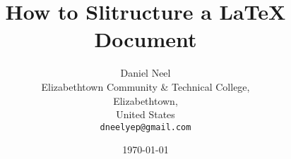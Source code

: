 \documentclass[11pt,a4paper,oneside]{article}
\begin{document}
\title{How to Slitructure a \LaTeX{} Document}
\author{Daniel Neel\\
  Elizabethtown Community \& Technical College,\\
  Elizabethtown,\\
  United States\\
  \texttt{dneelyep@gmail.com}}
\date{\today}
\maketitle
\end{document}

